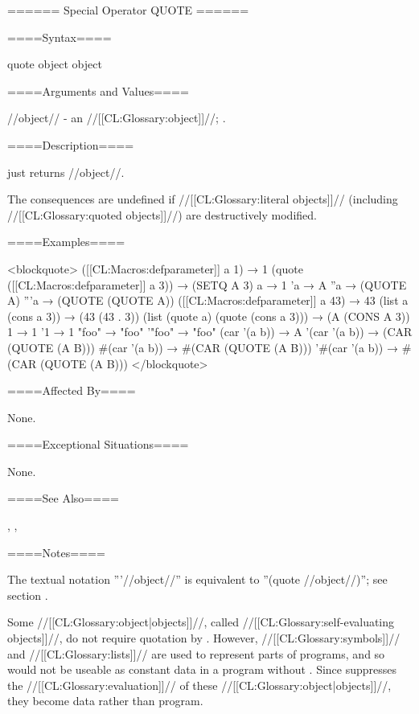 ====== Special Operator QUOTE ======

====Syntax====

\DefspecWithValues quote {object} {object}

====Arguments and Values====

//object// - an //[[CL:Glossary:object]]//; \noeval.

====Description====

 just returns //object//.

The consequences are undefined if //[[CL:Glossary:literal objects]]// (including //[[CL:Glossary:quoted objects]]//) are destructively modified.

====Examples====

<blockquote> ([[CL:Macros:defparameter]] a 1) → 1 (quote ([[CL:Macros:defparameter]] a 3)) → (SETQ A 3) a → 1 'a → A ''a → (QUOTE A) '''a → (QUOTE (QUOTE A)) ([[CL:Macros:defparameter]] a 43) → 43 (list a (cons a 3)) → (43 (43 . 3)) (list (quote a) (quote (cons a 3))) → (A (CONS A 3)) 1 → 1 '1 → 1 "foo" → "foo" '"foo" → "foo" (car '(a b)) → A '(car '(a b)) → (CAR (QUOTE (A B))) #(car '(a b)) → #(CAR (QUOTE (A B))) '#(car '(a b)) → #(CAR (QUOTE (A B))) </blockquote>

====Affected By====

None.

====Exceptional Situations====

None.

====See Also====

{\secref\Evaluation}, {\secref\QuoteMacro},

{\secref\ConstantModification}

====Notes====

The textual notation '''//object//'' is equivalent to ''(quote //object//)''; see section {\secref\ConstantModification}.

Some //[[CL:Glossary:object|objects]]//, called //[[CL:Glossary:self-evaluating objects]]//, do not require quotation by . However, //[[CL:Glossary:symbols]]// and //[[CL:Glossary:lists]]// are used to represent parts of programs, and so would not be useable as constant data in a program without . Since  suppresses the //[[CL:Glossary:evaluation]]// of these //[[CL:Glossary:object|objects]]//, they become data rather than program.

